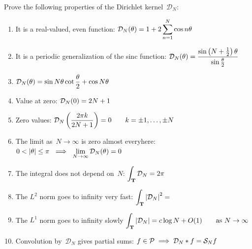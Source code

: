 \begin{exercice}
	Prove the following properties of the Dirichlet kernel~$\mathcal{D}_N$:
	\begin{enumerate}
		\item
			It is a real-valued, even function:
			$\displaystyle\mathcal{D}_N(\theta)=1+2\sum_{n=1}^{N}\cos n\theta$
		\item
			It is a periodic generalization of the sinc function:
			$\displaystyle\mathcal{D}_N(\theta)=\frac{\sin\left(N+\frac{1}{2}\right)\theta}{\sin\frac\theta2}$
		\item
			$\displaystyle\mathcal{D}_N(\theta)=\sin N\theta\cot\frac\theta2+\cos N\theta$
		\item
			Value at zero:
			$\displaystyle\mathcal{D}_N(0)=2N+1$
		\item
			Zero values:
			$\displaystyle\mathcal{D}_N\left(\frac{2\pi k}{2N+1}\right)=0
			\qquad k=\pm 1,\ldots,\pm N$
		\item
			The limit as~$N\to\infty$ is zero almost everyhere:
			$\ds 0<|\theta|\le\pi\ \implies\
			\lim_{N\to\infty}\mathcal{D}_N(\theta)=0$
		\item
			The integral does not depend on~$N$:
			$\displaystyle\int_{\mathbf{T}}\mathcal{D}_N = 2\pi$
		\item
			The $L^2$ norm goes to infinity very fast:
			$\displaystyle\int_{\mathbf{T}}\left|\mathcal{D}_N\right|^2 =$
		\item
			The $L^1$ norm goes to infinity slowly
			$\displaystyle\int_{\mathbf{T}}\left|\mathcal{D}_N\right| =c\log N +
			O(1)\qquad\mathrm{as}\ N\to\infty$
		\item
			Convolution by~$\mathcal{D}_N$ gives partial sums:
			$\displaystyle f\in\mathcal{P}\implies \mathcal{D}_N*f = \mathcal{S}_N f$
	\end{enumerate}
\end{exercice}


